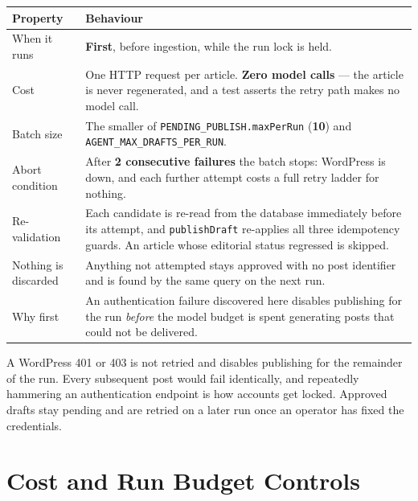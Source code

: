 \documentclass[11pt,a4paper]{article}
\newcommand{\var}[1]{\texttt{\small\hyphenpenalty=0\exhyphenpenalty=0\relax #1}}
\newcommand{\us}{\_\discretionary{}{}{}}
\newcommand{\brk}{\hyphenpenalty=0\exhyphenpenalty=0\relax}
\newcommand{\code}[1]{\texttt{\small\brk #1}}
\begin{document}
\begin{center}
\small
\begin{tabularx}{\textwidth}{@{}p{5.0cm} >{\RaggedRight}X@{}}
\toprule
\textbf{Property} & \textbf{Behaviour} \\
\midrule
When it runs & \textbf{First}, before ingestion, while the run lock is held. \\
Cost & One HTTP request per article. \textbf{Zero model calls} --- the article is
  never regenerated, and a test asserts the retry path makes no model call. \\
Batch size & The smaller of \code{PENDING\_PUBLISH.maxPerRun} (\textbf{10}) and
  \var{AGENT\us MAX\us DRAFTS\us PER\us RUN}. \\
Abort condition & After \textbf{2 consecutive failures} the batch stops: WordPress
  is down, and each further attempt costs a full retry ladder for nothing. \\
Re-validation & Each candidate is re-read from the database immediately before its
  attempt, and \code{publishDraft} re-applies all three idempotency guards. An
  article whose editorial status regressed is skipped. \\
Nothing is discarded & Anything not attempted stays approved with no post
  identifier and is found by the same query on the next run. \\
Why first & An authentication failure discovered here disables publishing for the
  run \emph{before} the model budget is spent generating posts that could not be
  delivered. \\
\bottomrule
\end{tabularx}
\end{center}

\begin{blockbox}
A WordPress 401 or 403 is not retried and disables publishing for the remainder of
the run. Every subsequent post would fail identically, and repeatedly hammering an
authentication endpoint is how accounts get locked. Approved drafts stay pending
and are retried on a later run once an operator has fixed the credentials.
\end{blockbox}

\section{Cost and Run Budget Controls}
\end{document}
